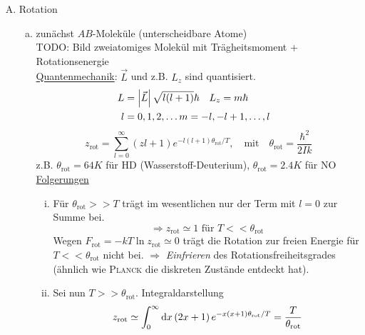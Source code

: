 \begin{enumerate}[A)]
    \item Rotation
    \begin{enumerate}[a)]
        \item zunächst $AB$-Moleküle (unterscheidbare Atome) \\
        TODO: Bild zweiatomiges Molekül mit Trägheitsmoment + Rotationsenergie \\ %
        \underline{Quantenmechanik}: $\vec{L}$ und z.B. $L_z$ sind quantisiert.
        \begin{equation}
            \begin{split}
                L &= \left| \vec{L} \right| \sqrt{l(l+1)} \hbar \quad L_z = m \hbar  \\
                l &= 0, 1, 2, \ldots m = -l, -l+1, \ldots, l &
            \end{split}
        \end{equation}
        \begin{equation}
            z_\text{rot} = \sum_{l=0}^{\infty} (zl + 1) e^{-l(l+1) \theta_\text{rot} / T}, \quad \text{mit} \quad \theta_\text{rot} = \frac{\hbar^2}{2 I k}
        \end{equation}
        z.B. $\theta_\text{rot} = 64K$ für HD (Wasserstoff-Deuterium), $\theta_\text{rot} = 2.4K$ für NO \\
        \underline{Folgerungen}
        \begin{enumerate}[i)]
            \item Für $\theta_\text{rot} >> T$ trägt im wesentlichen nur der Term mit $l=0$ zur Summe bei.
            \begin{equation}
                \Rightarrow z_\text{rot} \simeq 1 \text{ für } T << \theta_\text{rot}
            \end{equation}
            Wegen $F_\text{rot} = - k T \ln z_\text{rot} \simeq 0$ trägt die Rotation zur freien Energie für $T << \theta_\text{rot}$ nicht bei.
            $\Rightarrow$ \emph{Einfrieren} des Rotationsfreiheitsgrades (ähnlich wie \textsc{Planck} die diskreten Zustände entdeckt hat).
            \item Sei nun $T >> \theta_\text{rot}$. Integraldarstellung
            \begin{equation}
                \begin{split}
                    & z_\text{rot} \simeq \int_{0}^{\infty} \difd x \left( 2 x + 1 \right) e^{-x(x+1) \theta_\text{rot} / T} = \frac{T}{\theta_\text{rot}} \\

\end{split}
\end{equation}
\end{enumerate}
\end{enumerate}
\end{enumerate}

